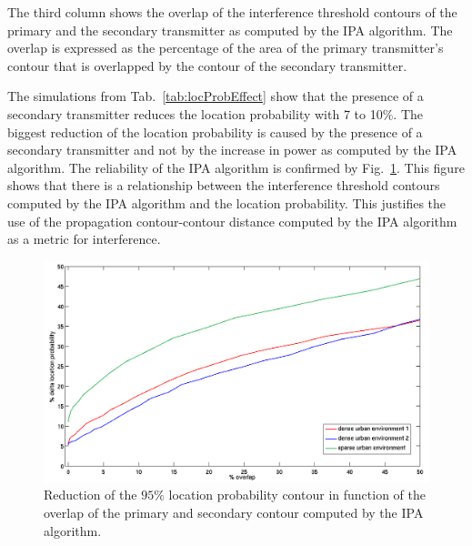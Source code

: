 The third column shows the overlap of the interference threshold contours of the primary and the secondary transmitter as computed by the IPA algorithm. The overlap is expressed as the percentage of the area of the primary transmitter's contour that is overlapped by the contour of the secondary transmitter.

The simulations from Tab.~\ref{tab:locProbEffect} show that the presence of a secondary transmitter reduces the location probability with 7 to 10$\%$. The biggest reduction of the location probability is caused by the presence of a secondary transmitter and not by the increase in power as computed by the IPA algorithm. The reliability of the IPA algorithm is confirmed by Fig.~\ref{fig:connectionLPOverlap}. This figure shows that there is a relationship between the interference threshold contours computed by the IPA algorithm and the location probability. This justifies the use of the propagation contour-contour distance computed by the IPA algorithm as a metric for interference.

\begin{figure}
\centering
\includegraphics[scale=0.3]{figures/contribution1/correlation.png}
\caption{\label{fig:connectionLPOverlap} Reduction of the $95\%$ location probability contour in function of the overlap of the primary and secondary contour computed by the IPA algorithm.}
\end{figure}

% 
